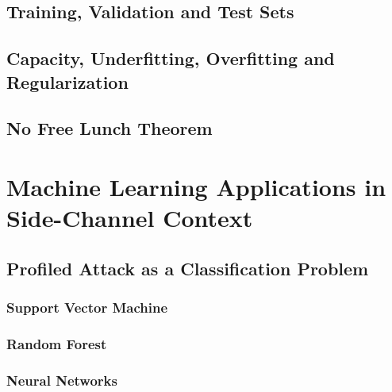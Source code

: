\subsection{Training, Validation and Test Sets}
\subsection{Capacity, Underfitting, Overfitting and Regularization}
\subsection{No Free Lunch Theorem}


\section{Machine Learning Applications in Side-Channel Context}
\subsection{Profiled Attack as a Classification Problem}
\subsubsection{Support Vector Machine}
\subsubsection{Random Forest}
\subsubsection{Neural Networks}

